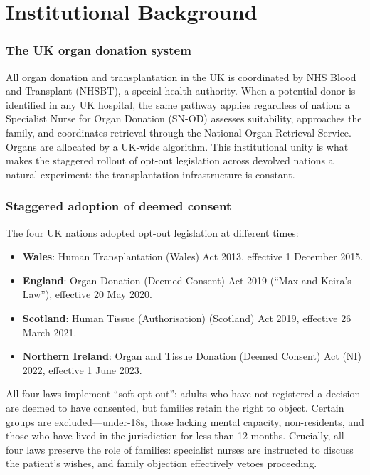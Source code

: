 \documentclass[12pt]{article}
\begin{document}
\section{Institutional Background}

\subsubsection*{The UK organ donation system} All organ donation and transplantation in the UK is coordinated by NHS Blood and Transplant (NHSBT), a special health authority. When a potential donor is identified in any UK hospital, the same pathway applies regardless of nation: a Specialist Nurse for Organ Donation (SN-OD) assesses suitability, approaches the family, and coordinates retrieval through the National Organ Retrieval Service. Organs are allocated by a UK-wide algorithm. This institutional unity is what makes the staggered rollout of opt-out legislation across devolved nations a natural experiment: the transplantation infrastructure is constant.

\subsubsection*{Staggered adoption of deemed consent} The four UK nations adopted opt-out legislation at different times:

\begin{itemize}[nosep]
\item \textbf{Wales}: Human Transplantation (Wales) Act 2013, effective 1 December 2015.
\item \textbf{England}: Organ Donation (Deemed Consent) Act 2019 (``Max and Keira's Law''), effective 20 May 2020.
\item \textbf{Scotland}: Human Tissue (Authorisation) (Scotland) Act 2019, effective 26 March 2021.
\item \textbf{Northern Ireland}: Organ and Tissue Donation (Deemed Consent) Act (NI) 2022, effective 1 June 2023.
\end{itemize}

All four laws implement ``soft opt-out'': adults who have not registered a decision are deemed to have consented, but families retain the right to object. Certain groups are excluded---under-18s, those lacking mental capacity, non-residents, and those who have lived in the jurisdiction for less than 12 months. Crucially, all four laws preserve the role of families: specialist nurses are instructed to discuss the patient's wishes, and family objection effectively vetoes proceeding.
\end{document}
